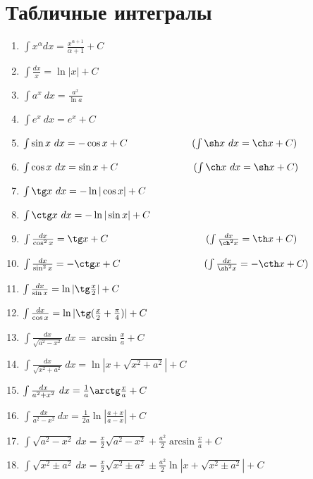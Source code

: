 \documentclass[a4paper, 12pt]{article}
\theoremstyle{definition}
\theoremstyle{plain}
\theoremstyle{remark}
\begin{document}
  \section*{Табличные интегралы}
  \begin{enumerate}
    \item $\int x^{\alpha}dx = \frac{x^{\alpha+1}}{\alpha+1} + C$
    \item $\int \frac{dx}{x} = \ln |x| + C$
    \item $\int a^x  \ dx = \frac{a^x}{\ln a}$
    \item $\int e^x \ dx = e^x + C$
    \item $\int \sin x \ dx = -\cos x + C \hspace{2.3cm} (\int \sh x \ dx = \ch x + C)$
    \item $\int \cos x \ dx = \sin x + C \hspace{2.7cm} (\int \ch x \ dx = \sh x + C)$
    \item $\int \tg x \ dx = -\ln|\cos x| + C$
    \item $\int \ctg x \ dx = -\ln|\sin x| + C$
    \item $\int \frac{dx}{\cos^2 x} = \tg x + C \hspace{3.5cm} (\int \frac{dx}{\ch^2 x} = \th x + C)$
    \item $\int \frac{dx}{\sin^2 x} = -\ctg x + C \hspace{3cm} (\int \frac{dx}{\sh^2 x} = -\cth x + C)$
    \item $\int \frac{dx}{\sin x} = \ln|\tg \frac{x}{2}| + C$
    \item $\int \frac{dx}{\cos x} = \ln|\tg (\frac{x}{2} + \frac{\pi}{4})| + C$
    \item $\int \frac{dx}{\sqrt{a^2 - x^2}} \ dx = \arcsin \frac{x}{a} + C $
    \item $\int \frac{dx}{\sqrt{x^2 + a^2}} \ dx = \ln |x + \sqrt{x^2 + a^2}|+ C$
    \item $\int \frac{dx}{a^2 + x^2} \ dx = \frac{1}{a}\arctg \frac{x}{a}+ C$
    \item $\int \frac{dx}{a^2 - x^2} \ dx = \frac{1}{2a} \ln |\frac{a+x}{a-x}|+ C$
    \item $\int \sqrt{a^2-x^2} \ dx = \frac{x}{2} \sqrt{a^2-x^2} + \frac{a^2}{2} \arcsin \frac{x}{a} + C$
    \item $\int \sqrt{x^2\pm a^2} \ dx = \frac{x}{2} \sqrt{x^2\pm a^2} \pm \frac{a^2}{2} \ln |x + \sqrt{x^2\pm a^2}| + C$
  \end{enumerate}
  
\end{document}
